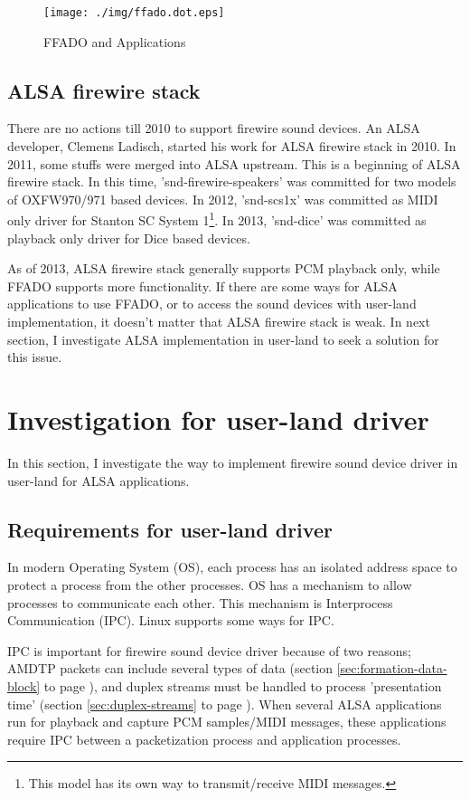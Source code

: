 \documentclass[onecolumn]{article}
\begin{document}
\begin{figure}[H]
	\centering
	\texttt{[image: ./img/ffado.dot.eps]}
	\caption{{FFADO and Applications}}
	\label{ffado_apps}
\end{figure}


\subsection{ALSA firewire stack}
There are no actions till 2010 to support firewire sound devices. An ALSA developer, Clemens Ladisch, started his work for ALSA firewire stack in 2010. In 2011, some stuffs were merged into ALSA upstream. This is a beginning of ALSA firewire stack. In this time, 'snd-firewire-speakers' was committed for two models of OXFW970/971 based devices. In 2012, 'snd-scs1x' was committed as MIDI only driver for Stanton SC System 1\footnote{This model has its own way to transmit/receive MIDI messages.}. In 2013, 'snd-dice' was committed as playback only driver for Dice based devices.

As of 2013, ALSA firewire stack generally supports PCM playback only, while FFADO supports more functionality. If there are some ways for ALSA applications to use FFADO, or to access the sound devices with user-land implementation, it doesn't matter that ALSA firewire stack is weak. In next section, I investigate ALSA implementation in user-land to seek a solution for this issue.


\section{Investigation for user-land driver}

In this section, I investigate the way to implement firewire sound device driver in user-land for ALSA applications.

\subsection{Requirements for user-land driver}

In modern Operating System (OS), each process has an isolated address space to protect a process from the other processes. OS has a mechanism to allow processes to communicate each other. This mechanism is Interprocess Communication (IPC). Linux supports some ways for IPC.

IPC is important for firewire sound device driver because of two reasons; AMDTP packets can include several types of data (section \ref{sec:formation-data-block} to page \pageref{sec:formation-data-block}), and duplex streams must be handled to process 'presentation time' (section \ref{sec:duplex-streams} to page \pageref{sec:duplex-streams}). When several ALSA applications run for playback and capture PCM samples/MIDI messages, these applications require IPC between a packetization process and application processes.
\end{document}
